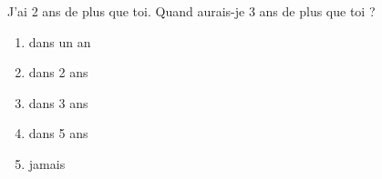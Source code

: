 J'ai 2 ans de plus que toi. Quand aurais-je 3 ans de plus que toi ?
\begin{multicols}{5}
  \begin{enumerate}[A/]
  \item dans un an
  \item dans 2 ans
  \item dans 3 ans
  \item dans 5 ans
  \item jamais
  \end{enumerate}
\end{multicols}